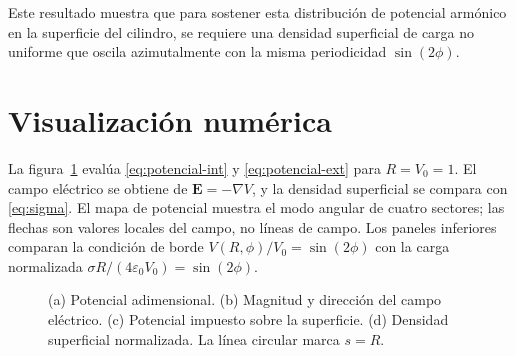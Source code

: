 \documentclass[11pt]{article}
\newcommand{\includevisualizacion}[1][]{%
}
\begin{document}
Este resultado muestra que para sostener esta distribución de potencial armónico en la superficie del cilindro, se requiere una densidad superficial de carga no uniforme que oscila azimutalmente con la misma periodicidad $\sin(2\phi)$.

\clearpage
\section*{Visualización numérica}
La figura~\ref{fig:numerica} evalúa \eqref{eq:potencial-int} y
\eqref{eq:potencial-ext} para $R=V_0=1$. El campo eléctrico se obtiene de
$\mathbf{E}=-\nabla V$, y la densidad superficial se compara con
\eqref{eq:sigma}. El mapa de potencial
muestra el modo angular de cuatro sectores; las flechas son valores locales del
campo, no líneas de campo. Los paneles inferiores comparan la condición de
borde $V(R,\phi)/V_0=\sin(2\phi)$ con la carga normalizada
$\sigma R/(4\varepsilon_0V_0)=\sin(2\phi)$.
\begin{figure}[htbp]
 \centering
 \includevisualizacion[width=0.98\textwidth]
 \caption{(a) Potencial adimensional. (b) Magnitud y dirección del campo
 eléctrico. (c) Potencial impuesto sobre la superficie. (d) Densidad
 superficial normalizada. La línea circular marca $s=R$.}
 \label{fig:numerica}
\end{figure}
\end{document}
